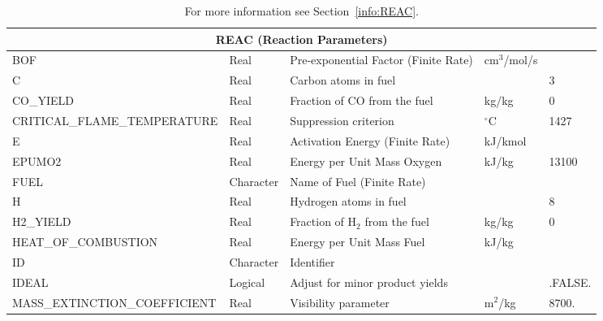\documentclass[11pt]{book}
\begin{document}
\begin{table}[H]
\caption{For more information see Section~\ref{info:REAC}.}\label{tbl:REAC}
\noindent
\begin{tabular*}{\textwidth}{@{\extracolsep{\fill}}|l|l|l|l|l|}
\hline
\multicolumn{5}{|c|}{{\ct REAC} (Reaction Parameters)} \\ \hline \hline
{\ct BOF}                                 & Real        & Pre-exponential Factor (Finite Rate)      &   cm$^3$/mol/s    &     \\ \hline
{\ct C}                                   & Real        & Carbon atoms in fuel                      &                   & 3    \\ \hline
{\ct CO\_YIELD}                           & Real        & Fraction of CO from the fuel              & kg/kg             & 0        \\ \hline
{\ct CRITICAL\_FLAME\_TEMPERATURE}        & Real        & Suppression criterion                     &   $^\circ$C       & 1427    \\ \hline
{\ct E}                                   & Real        & Activation Energy (Finite Rate)           &   kJ/kmol         &     \\ \hline
{\ct EPUMO2}                              & Real        & Energy per Unit Mass Oxygen               &   kJ/kg           & 13100    \\ \hline
{\ct FUEL}                                & Character   & Name of Fuel (Finite Rate)                &                   &     \\ \hline
{\ct H}                                   & Real        & Hydrogen atoms in fuel                    &                   & 8    \\ \hline
{\ct H2\_YIELD}                           & Real        & Fraction of H$_2$ from the fuel           & kg/kg             & 0        \\ \hline
{\ct HEAT\_OF\_COMBUSTION}                & Real        & Energy per Unit Mass Fuel                 &   kJ/kg           &         \\ \hline
{\ct ID}                                  & Character   & Identifier                                &                   &     \\ \hline
{\ct IDEAL}                               & Logical     & Adjust for minor product yields           &                   & {\ct .FALSE.}    \\ \hline
{\ct MASS\_EXTINCTION\_COEFFICIENT}       & Real        & Visibility parameter                      &  m$^2$/kg         & 8700.    \\ \hline

\end{tabular*}
\end{table}
\end{document}
